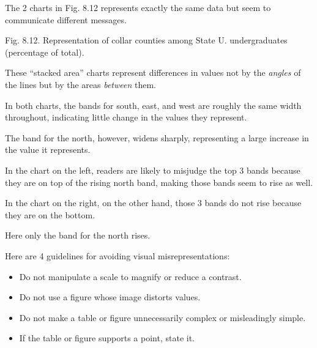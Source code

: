 \documentclass[oneside]{book}
\numberwithin{equation}{section}
\begin{document}
%

The 2 charts in Fig. 8.12 represents exactly the same data but seem to communicate different messages.

\textsf{Fig. 8.12. Representation of collar counties among State U. undergraduates (percentage of total).}

These ``stacked area'' charts represent differences in values not by the \textit{angles} of the lines but by the areas \textit{between} them.

In both charts, the bands for south, east, and west are roughly the same width throughout, indicating little change in the values they represent.

The band for the north, however, widens sharply, representing a large increase in the value it represents.

In the chart on the left, readers are likely to misjudge the top 3 bands because they are on top of the rising north band, making those bands seem to rise as well.

In the chart on the right, on the other hand, those 3 bands do not rise because they are on the bottom.

Here only the band for the north rises.

%
Here are 4 guidelines for avoiding visual misrepresentations:
\begin{itemize}
    \item Do not manipulate a scale to magnify or reduce a contrast.
    \item Do not use a figure whose image distorts values.
    \item Do not make a table or figure unnecessarily complex or misleadingly simple.
    \item If the table or figure supports a point, state it.
\end{itemize}
\end{document}
